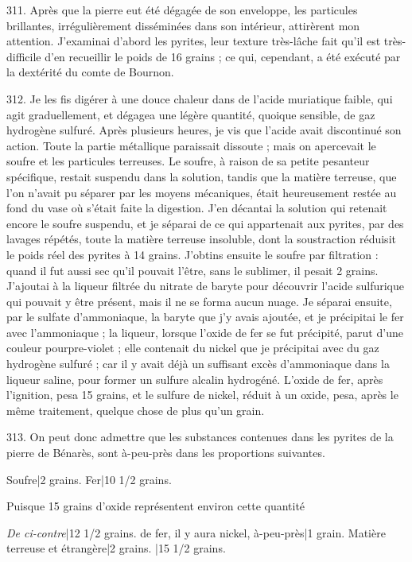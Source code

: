 \documentclass[a4paper, 11pt, oneside, polutonikogreek, french]{article}
\begin{document}
311. Après que la pierre eut été dégagée de son enveloppe, les particules brillantes, irrégulièrement disséminées dans son intérieur, attirèrent mon attention. J'examinai d'abord les pyrites, leur texture très-lâche fait qu'il est très-difficile d'en recueillir le poids de 16 grains ; ce qui, cependant, a été exécuté par la dextérité du comte de Bournon.

312. Je les fis digérer à une douce chaleur dans de l'acide muriatique faible, qui agit graduellement, et dégagea une légère quantité, quoique sensible, de gaz hydrogène sulfuré. Après plusieurs heures, je vis que l'acide avait discontinué son action. Toute la partie métallique paraissait dissoute ; mais on apercevait le soufre et les particules terreuses. Le soufre, à raison de sa petite pesanteur spécifique, restait suspendu dans la solution, tandis que la matière terreuse, que l'on n'avait pu séparer par les moyens mécaniques, était heureusement restée au fond du vase où s'était faite la digestion. J'en décantai la solution qui retenait encore le soufre suspendu, et je séparai de ce qui appartenait aux pyrites, par des lavages répétés, toute la matière terreuse insoluble, dont la soustraction réduisit le poids réel des pyrites à 14 grains. J'obtins ensuite le soufre par filtration : quand il fut aussi sec qu'il pouvait l'être, sans le sublimer, il pesait 2 grains. J'ajoutai à la liqueur filtrée du nitrate de baryte pour découvrir l'acide sulfurique qui pouvait y être présent, mais il ne se forma aucun nuage. Je séparai ensuite, par le sulfate d'ammoniaque, la baryte que j'y avais ajoutée, et je précipitai le fer avec l'ammoniaque ; la liqueur, lorsque l'oxide de fer se fut précipité, parut d'une couleur pourpre-violet ; elle contenait du nickel que je précipitai avec du gaz hydrogène sulfuré ; car il y avait déjà un suffisant excès d'ammoniaque dans la liqueur saline, pour former un sulfure alcalin hydrogéné. L'oxide de fer, après l'ignition, pesa 15 grains, et le sulfure de nickel, réduit à un oxide, pesa, après le même traitement, quelque chose de plus qu'un grain.

313. On peut donc admettre que les substances contenues dans les pyrites de la pierre de Bénarès, sont à-peu-près dans les proportions suivantes.

Soufre|2 grains.
Fer|10 1/2 grains.

Puisque 15 grains d'oxide représentent environ cette quantité

\emph{De ci-contre}|12 1/2 grains.
de fer, il y aura nickel, à-peu-près|1 grain.
Matière terreuse et étrangère|2 grains.
|15 1/2 grains.
\end{document}
